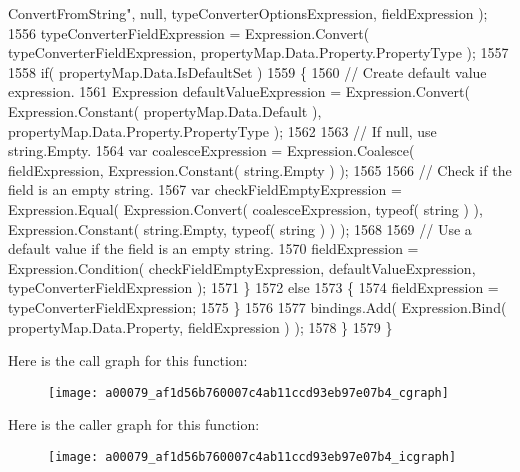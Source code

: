 \begin{DoxyCode}
{      ConvertFromString"}, null, typeConverterOptionsExpression, fieldExpression );
1556                 typeConverterFieldExpression = Expression.Convert( typeConverterFieldExpression, 
      propertyMap.Data.Property.PropertyType );
1557 
1558                 \textcolor{keywordflow}{if}( propertyMap.Data.IsDefaultSet )
1559                 \{
1560                     \textcolor{comment}{// Create default value expression.}
1561                     Expression defaultValueExpression = Expression.Convert( Expression.Constant( 
      propertyMap.Data.Default ), propertyMap.Data.Property.PropertyType );
1562 
1563                     \textcolor{comment}{// If null, use string.Empty.}
1564                     var coalesceExpression = Expression.Coalesce( fieldExpression, Expression.Constant( 
      string.Empty ) );
1565 
1566                     \textcolor{comment}{// Check if the field is an empty string.}
1567                     var checkFieldEmptyExpression = Expression.Equal( Expression.Convert( 
      coalesceExpression, typeof( \textcolor{keywordtype}{string} ) ), Expression.Constant( \textcolor{keywordtype}{string}.Empty, typeof( \textcolor{keywordtype}{string} ) ) );
1568 
1569                     \textcolor{comment}{// Use a default value if the field is an empty string.}
1570                     fieldExpression = Expression.Condition( checkFieldEmptyExpression, 
      defaultValueExpression, typeConverterFieldExpression );
1571                 \}
1572                 \textcolor{keywordflow}{else}
1573                 \{
1574                     fieldExpression = typeConverterFieldExpression;
1575                 \}
1576 
1577                 bindings.Add( Expression.Bind( propertyMap.Data.Property, fieldExpression ) );
1578             \}
1579         \}
\end{DoxyCode}


Here is the call graph for this function\-:
\nopagebreak
\begin{figure}[H]
\begin{center}
\leavevmode
\texttt{[image: a00079\_af1d56b760007c4ab11ccd93eb97e07b4\_cgraph]}
\end{center}
\end{figure}




Here is the caller graph for this function\-:
\nopagebreak
\begin{figure}[H]
\begin{center}
\leavevmode
\texttt{[image: a00079\_af1d56b760007c4ab11ccd93eb97e07b4\_icgraph]}
\end{center}
\end{figure}


